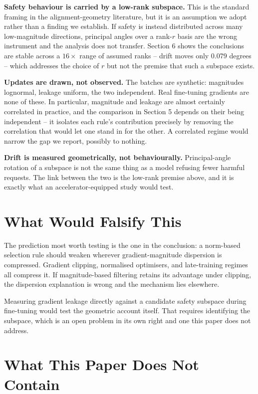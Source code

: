\documentclass[10pt,twocolumn,letterpaper]{article}
\begin{document}
\textbf{Safety behaviour is carried by a low-rank subspace.} This is the standard framing in the alignment-geometry literature, but it is an assumption we adopt rather than a finding we establish. If safety is instead distributed across many low-magnitude directions, principal angles over a rank-$r$ basis are the wrong instrument and the analysis does not transfer. Section 6 shows the conclusions are stable across a $16\times$ range of assumed ranks -- drift moves only 0.079 degrees -- which addresses the choice of $r$ but not the premise that such a subspace exists.

\textbf{Updates are drawn, not observed.} The batches are synthetic: magnitudes lognormal, leakage uniform, the two independent. Real fine-tuning gradients are none of these. In particular, magnitude and leakage are almost certainly correlated in practice, and the comparison in Section 5 depends on their being independent -- it isolates each rule's contribution precisely by removing the correlation that would let one stand in for the other. A correlated regime would narrow the gap we report, possibly to nothing.

\textbf{Drift is measured geometrically, not behaviourally.} Principal-angle rotation of a subspace is not the same thing as a model refusing fewer harmful requests. The link between the two is the low-rank premise above, and it is exactly what an accelerator-equipped study would test.


\section{What Would Falsify This}


The prediction most worth testing is the one in the conclusion: a norm-based selection rule should weaken wherever gradient-magnitude dispersion is compressed. Gradient clipping, normalised optimisers, and late-training regimes all compress it. If magnitude-based filtering retains its advantage under clipping, the dispersion explanation is wrong and the mechanism lies elsewhere.

Measuring gradient leakage directly against a candidate safety subspace during fine-tuning would test the geometric account itself. That requires identifying the subspace, which is an open problem in its own right and one this paper does not address.


\section{What This Paper Does Not Contain}
\end{document}
